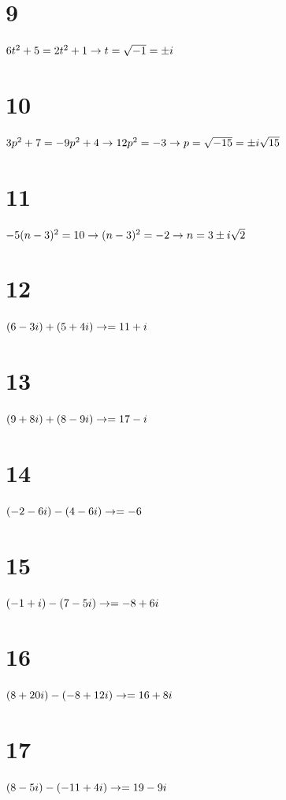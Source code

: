 \documentclass{article}
\theoremstyle{definition}
\begin{document}
\section*{9}
$6t^2+5=2t^2+1\newline\rightarrow t=\sqrt{-1}=\pm i$

\section*{10}
$3p^2+7=-9p^2+4\newline\rightarrow 12p^2=-3\newline\rightarrow p=\sqrt{-15}=\pm i\sqrt{15}$

\section*{11}
$-5(n-3)^2=10\newline\rightarrow (n-3)^2=-2\newline\rightarrow n=3\pm i\sqrt{2}$ 

\section*{12}
$(6-3i)+(5+4i)\newline\rightarrow =11+i$

\section*{13}
$(9+8i)+(8-9i)\newline\rightarrow =17-i$

\section*{14}
$(-2-6i)-(4-6i)\newline\rightarrow =-6$

\section*{15}
$(-1+i)-(7-5i)\newline\rightarrow =-8+6i$

\section*{16}
$(8+20i)-(-8+12i)\newline\rightarrow =16+8i$

\section*{17}
$(8-5i)-(-11+4i)\newline\rightarrow =19-9i$
\end{document}
